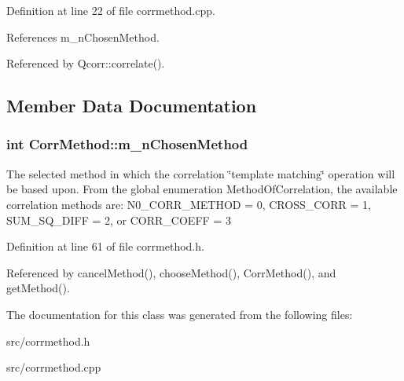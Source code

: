 Definition at line 22 of file corrmethod.cpp.

References m\_\-nChosenMethod.

Referenced by Qcorr::correlate().

\subsection{Member Data Documentation}
\hypertarget{classCorrMethod_3e64e1a2c9eabff57b7e58eaff13f45f}{
\subsubsection[{m\_\-nChosenMethod}]{\setlength{\rightskip}{0pt plus 5cm}int {\bf CorrMethod::m\_\-nChosenMethod}}}
\label{classCorrMethod_3e64e1a2c9eabff57b7e58eaff13f45f}


The selected method in which the correlation \char`\"{}template matching\char`\"{} operation will be based upon. From the global enumeration MethodOfCorrelation, the available correlation methods are: N0\_\-CORR\_\-METHOD = 0, CROSS\_\-CORR = 1, SUM\_\-SQ\_\-DIFF = 2, or CORR\_\-COEFF = 3 

Definition at line 61 of file corrmethod.h.

Referenced by cancelMethod(), chooseMethod(), CorrMethod(), and getMethod().

The documentation for this class was generated from the following files:\begin{CompactItemize}
\item 
src/corrmethod.h\item 
src/corrmethod.cpp\end{CompactItemize}
